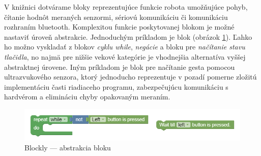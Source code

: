 
V knižnici dotvárame bloky reprezentujúce funkcie robota umožňujúce pohyb, čítanie hodnôt meraných senzormi, sériovú komunikáciu či komunikáciu rozhraním bluetooth. Komplexitou funkcie poskytovanej blokom je možné nastaviť úroveň abstrakcie. Jednoduchým príkladom je blok  (obrázok \ref{obr:wait-till-couch}). Ľahko ho možno vyskladať z blokov \textit{cyklu while}, \textit{negácie} a bloku pre \textit{načítanie stavu tlačidla}, no najmä pre nižšie vekové kategórie je vhodnejšia alternatíva vyššej abstraktnej úrovene. Iným príkladom je blok pre načítanie gesta pomocou ultrazvukového senzora, ktorý jednoducho reprezentuje v pozadí pomerne zložitú implementáciu časti riadiaceho programu, zabezpečujúcu komunikáciu s hardvérom a elimináciu chyby opakovaným meraním.

\begin{figure}
\centerline{\includegraphics[width=1\textwidth]{images/wait-till-couch}}
\caption[Blockly --- abstrakcia bloku ]{Blockly --- abstrakcia bloku }
\label{obr:wait-till-couch}
\end{figure}

